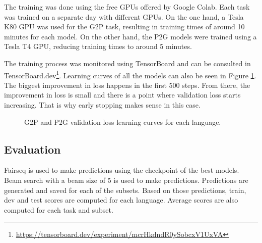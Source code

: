 \documentclass[11pt,a4paper]{article}
\begin{document}
The training was done using the free GPUs offered by Google Colab. Each task was trained on a separate day with different GPUs. On the one hand, a Tesla K80 GPU was used for the G2P task, resulting in training times of around 10 minutes for each model. On the other hand, the P2G models were trained using a Tesla T4 GPU, reducing training times to around 5 minutes. 

The training process was monitored using TensorBoard and can be consulted in TensorBoard.dev\footnote{\url{https://tensorboard.dev/experiment/mcrHkdndR0ySobcxV1UxVA}}. Learning curves of all the models can also be seen in Figure \ref{fig:g2p_p2g_loss}. The biggest improvement in loss happens in the first 500 steps. From there, the improvement in loss is small and there is a point where validation loss starts increasing. That is why early stopping makes sense in this case.

\begin{figure}
    \centering
    \caption{G2P and P2G validation loss learning curves for each language.}
    \label{fig:g2p_p2g_loss}
\end{figure}

\subsection{Evaluation}

Fairseq is used to make predictions using the checkpoint of the best models. Beam search with a beam size of 5 is used to make predictions. Predictions are generated and saved for each of the subsets. Based on those predictions, train, dev and test scores are computed for each language. Average scores are also computed for each task and subset.
\end{document}
